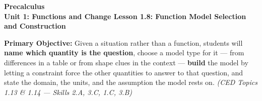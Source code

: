 \documentclass[10pt]{article}
\newcommand{\CourseName}{Precalculus}
\newcommand{\UnitNumberName}{Unit 1: Functions and Change \quad}
\newcommand{\LessonNumberName}{Lesson 1.8: Function Model Selection and Construction}
\begin{document}
\begin{center}
    {\Large\bfseries \CourseName \\
    {\small\bfseries \UnitNumberName \LessonNumberName}}
\end{center}

\begin{tcolorbox}[colback=lilac, colframe=plum, boxrule=0.9pt, arc=2mm,
    left=2mm, right=2mm, top=1.5mm, bottom=1.5mm]
    \textbf{Primary Objective:} Given a situation rather than a function,
    students will \textbf{name which quantity is the question}, choose a model
    type for it --- from differences in a table or from shape clues in the
    context --- \textbf{build} the model by letting a constraint force the other
    quantities to answer to that question, and state the domain, the units, and
    the assumption the model rests on.
    \hfill\textit{\small (CED Topics 1.13 \& 1.14 --- Skills 2.A, 3.C, 1.C, 3.B)}
\end{tcolorbox}
\end{document}

